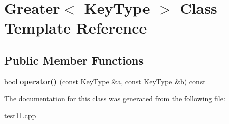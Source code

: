 \hypertarget{class_greater}{\section{Greater$<$ Key\+Type $>$ Class Template Reference}
\label{class_greater}
}
\subsection*{Public Member Functions}
\begin{DoxyCompactItemize}
\item 
\hypertarget{class_greater_a79d9cb7121723ee9d65b11cb2fce0379}{bool {\bfseries operator()} (const Key\+Type \&a, const Key\+Type \&b) const }\label{class_greater_a79d9cb7121723ee9d65b11cb2fce0379}

\end{DoxyCompactItemize}


The documentation for this class was generated from the following file\+:\begin{DoxyCompactItemize}
\item 
test11.\+cpp\end{DoxyCompactItemize}
